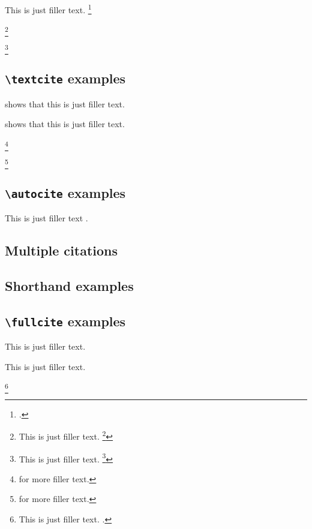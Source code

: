 \documentclass[a4paper]{article}
\newcommand{\cmd}[1]{\texttt{\textbackslash #1}}
\begin{document}
This is just filler text. \footcite[59]{aristotle:rhetoric}

\footnote{This is just filler text. \footcite[See][]{springer}}

\footnote{This is just filler text. \footcite[See][59--63]{springer}}

\subsection*{\cmd{textcite} examples}

\textcite{aristotle:rhetoric} shows that this is just filler text.

\textcite[59]{aristotle:rhetoric} shows that this is just filler text.

\footnote{\textcite[See][]{springer} for more filler text.}

\footnote{\textcite[See][59--63]{springer} for more filler text.}

\subsection*{\cmd{autocite} examples}

This is just filler text \autocite{springer}.

\subsection*{Multiple citations}

\cite{aristotle:rhetoric,aristotle:physics,aristotle:poetics}

\subsection*{Shorthand examples}

\cite{Annales-Quedlinburgenses}

\cite[25]{kant:kpv}

\cite[again]{kant:kpv}

\cite{Annales-Quedlinburgenses}

\subsection*{\cmd{fullcite} examples}

This is just filler text. 

This is just filler text. 

\footnote{This is just filler text. .}
\end{document}
